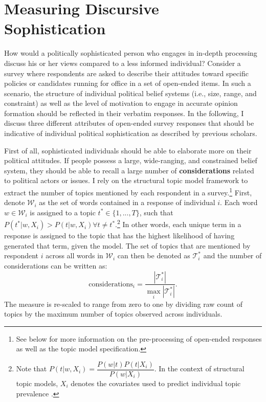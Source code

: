 \documentclass[12pt]{article}
\begin{document}
\section*{Measuring Discursive Sophistication}

How would a politically sophisticated person who engages in in-depth processing discuss his or her views compared to a less informed individual? Consider a survey where respondents are asked to describe their attitudes toward specific policies or candidates running for office in a set of open-ended items. In such a scenario, the structure of individual political belief systems (i.e., size, range, and constraint) as well as the level of motivation to engage in accurate opinion formation should be reflected in their verbatim responses. In the following, I discuss three different attributes of open-ended survey responses that should be indicative of individual political sophistication as described by previous scholars.

First of all, sophisticated individuals should be able to elaborate more on their political attitudes. If people possess a large, wide-ranging, and constrained belief system, they should be able to recall a large number of \textbf{considerations} related to political actors or issues. I rely on the structural topic model framework \citep{roberts2014structural} to extract the number of topics mentioned by each respondent in a survey.\footnote{See below for more information on the pre-processing of open-ended responses as well as the topic model specification.} First, denote $\mathcal{W}_i$ as the set of words contained in a response of individual $i$. Each word $w\in\mathcal{W}_i$ is assigned to a topic $t^* \in \{1,...,T\} $, such that $P(t^*|w,X_i) > P(t|w,X_i) \forall t\neq t^*$.\footnote{Note that $P(t|w,X_i)=\dfrac{P(w|t)P(t|X_i)}{P(w|X_i)}$. In the context of structural topic models, $X_i$ denotes the covariates used to predict individual topic prevalence \citep[see][for details]{roberts2014structural}.} In other words, each unique term in a response is assigned to the topic that has the highest likelihood of having generated that term, given the model. The set of topics that are mentioned by respondent $i$ across all words in $\mathcal{W}_i$ can then be denoted as $\mathcal{T}^*_i$ and the number of considerations can be written as:
\begin{equation}
\text{considerations}_i = \dfrac{|\mathcal{T}^*_i|}{\max_i|\mathcal{T}^*_i|}.
\end{equation}
The measure is re-scaled to range from zero to one by dividing raw count of topics by the maximum number of topics observed across individuals.
\end{document}
